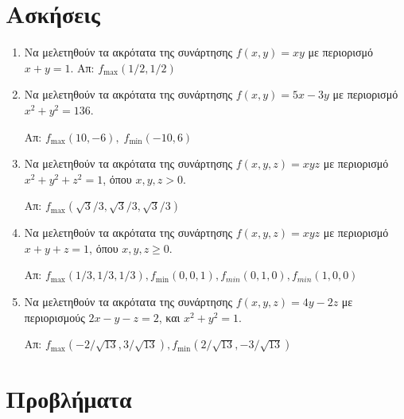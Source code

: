 


\pagestyle{askhseis}

\renewcommand{\vec}{\mathbf}



\begin{center}
  \minibox{\large \bfseries \textcolor{Col1}{Ασκήσεις στα Ακρότατα Με Περιορισμό}}
\end{center}

\vspace{\baselineskip}

\section*{Ασκήσεις}

\begin{enumerate}
  \item Να μελετηθούν τα ακρότατα της συνάρτησης $ f(x,y) = xy $ με περιορισμό 
    $ x+y=1 $. \hfill Απ: $ f_{\max}(1/2,1/2) $ 
  \item Να μελετηθούν τα ακρότατα της συνάρτησης $ f(x,y) = 5x-3y $ με περιορισμό 
    $x^{2}+y^{2}=136$. 

    \hfill Απ: $ f_{\max}(10,-6), \; f_{\min}(-10,6) $ 

  \item Να μελετηθούν τα ακρότατα της συνάρτησης $ f(x,y,z) = xyz $ με περιορισμό 
    $x^{2}+y^{2}+z^{2}=1 $, όπου $ x,y,z>0 $. 

    \hfill Απ: $ f_{\max}(\sqrt{3} /3,\sqrt{3} /3,\sqrt{3} /3) $ 

  \item Να μελετηθούν τα ακρότατα της συνάρτησης $ f(x,y,z) = xyz $ με περιορισμό 
    $x+y+z=1 $, όπου $ x,y,z \geq 0 $. 

    \hfill Απ: $ f_{\max}(1/3,1/3,1/3), f_{\min}(0,0,1), f_{min}(0,1,0), 
    f_{min}(1,0,0) $ 

  \item Να μελετηθούν τα ακρότατα της συνάρτησης $ f(x,y,z) = 4y-2z $ με περιορισμούς 
    $2x-y-z=2$, και $x^{2}+y^{2}=1$. 

    \hfill Απ: $ f_{\max}(-2/ \sqrt{13} , 3 / \sqrt{13}), 
    f_{\min}(2 / \sqrt{13}, - 3 / \sqrt{13})$ 
\end{enumerate}


\section*{Προβλήματα}

